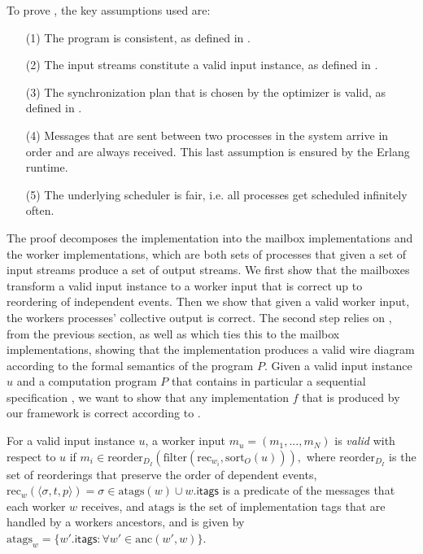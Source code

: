 To prove , the key assumptions used are:
\begin{enumerate}
\item[(1)] The program is consistent, as defined in .
\item[(2)] The input streams constitute a valid input instance, as defined in .
\item[(3)] The synchronization plan that is chosen by the optimizer is valid, as defined in .
\item[(4)] Messages that are sent between two processes in the system arrive in order and are always received. This last assumption is ensured by the Erlang runtime.
\item[(5)] The underlying scheduler is fair, i.e. all processes get scheduled infinitely often.
\end{enumerate}

The proof decomposes the implementation into the mailbox
implementations and the worker implementations, which are both sets of
processes that given a set of input streams produce a set of output
streams. We first show that the mailboxes transform a valid input
instance to a worker input that is correct up to reordering of
independent events. Then we show that given a valid worker input, the
workers processes' collective output is correct.
The second step relies on
,
from the previous section, as well as
which ties this to the mailbox implementations,
showing that the implementation produces a valid wire diagram according to the formal semantics of the program $P$.
Given a valid input instance $u$ and a computation program $P$ that contains
in particular a sequential specification ,
we want to show that any implementation $f$ that is produced by our framework is correct according to .

\begin{definition}
For a valid input instance $u$, a worker input $m_u = (m_1, ..., m_N)$
is \emph{valid} with respect to $u$ if $m_i \in \mathrm{reorder}_{D_I}
(\mathrm{filter}(\mathrm{rec}_{w_i}, \mathrm{sort}_O(u))),$ where
$\mathrm{reorder}_{D_I}$ is the set of reorderings that preserve the
order of dependent events,
  $\mathrm{rec}_w(\langle \sigma, t, p\rangle) = \sigma \in \mathrm{atags}(w) \cup w.\mathsf{itags}$
  is a predicate of the messages that each worker $w$ receives,
  and $\mathrm{atags}$ is the set of implementation tags that are handled by a workers ancestors, and is given by $\mathrm{atags}_w = \{ {w'}.\mathsf{itags} : \forall w' \in \mathrm{anc}(w', w)\}$.
\end{definition}

